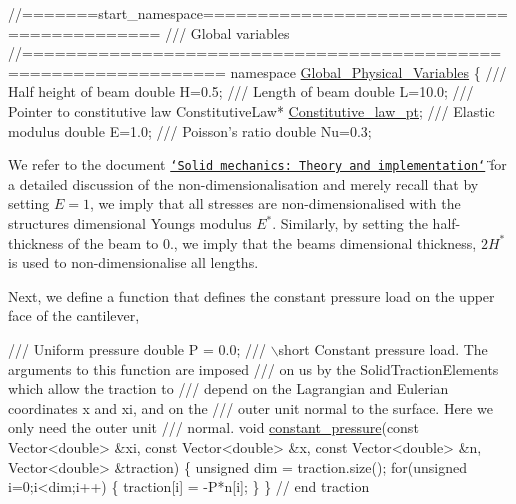  
\begin{DoxyCodeInclude}
\textcolor{comment}{//=======start\_namespace==========================================}
\textcolor{comment}{/// Global variables}
\textcolor{comment}{}\textcolor{comment}{//================================================================}
\textcolor{keyword}{namespace }\hyperlink{namespaceGlobal__Physical__Variables}{Global\_Physical\_Variables}
\{
\textcolor{comment}{}
\textcolor{comment}{ /// Half height of beam}
\textcolor{comment}{} \textcolor{keywordtype}{double} H=0.5;
\textcolor{comment}{}
\textcolor{comment}{ /// Length of beam}
\textcolor{comment}{} \textcolor{keywordtype}{double} L=10.0;
\textcolor{comment}{}
\textcolor{comment}{ /// Pointer to constitutive law}
\textcolor{comment}{} ConstitutiveLaw* \hyperlink{namespaceGlobal__Physical__Variables_a5d5f19442938130d36ee7476ae25049c}{Constitutive\_law\_pt};
\textcolor{comment}{}
\textcolor{comment}{ /// Elastic modulus}
\textcolor{comment}{} \textcolor{keywordtype}{double} E=1.0;
\textcolor{comment}{}
\textcolor{comment}{ /// Poisson's ratio}
\textcolor{comment}{} \textcolor{keywordtype}{double} Nu=0.3;

\end{DoxyCodeInclude}


We refer to the document \href{../../solid_theory/html/index.html}{\tt \char`\"{}\+Solid mechanics\+: Theory and implementation\char`\"{}} for a detailed discussion of the non-\/dimensionalisation and merely recall that by setting $ E = 1$, we imply that all stresses are non-\/dimensionalised with the structure\textquotesingle{}s dimensional Young\textquotesingle{}s modulus $ E^* $. Similarly, by setting the half-\/thickness of the beam to 0., we imply that the beam\textquotesingle{}s dimensional thickness, $ 2H^*$ is used to non-\/dimensionalise all lengths.

Next, we define a function that defines the constant pressure load on the upper face of the cantilever,


\begin{DoxyCodeInclude}
 \textcolor{comment}{/// Uniform pressure}
 \textcolor{keywordtype}{double} P = 0.0;
\textcolor{comment}{}
\textcolor{comment}{ /// \(\backslash\)short Constant pressure load. The arguments to this function are imposed}
\textcolor{comment}{ /// on us by the SolidTractionElements which allow the traction to }
\textcolor{comment}{ /// depend on the Lagrangian and Eulerian coordinates x and xi, and on the }
\textcolor{comment}{ /// outer unit normal to the surface. Here we only need the outer unit}
\textcolor{comment}{ /// normal.}
\textcolor{comment}{} \textcolor{keywordtype}{void} \hyperlink{namespaceGlobal__Physical__Variables_a19f4e20a92e7d216b4d2b00308f96917}{constant\_pressure}(\textcolor{keyword}{const} Vector<double> &xi, \textcolor{keyword}{const} Vector<double> &x,
                        \textcolor{keyword}{const} Vector<double> &n, Vector<double> &traction)
 \{
  \textcolor{keywordtype}{unsigned} dim = traction.size();
  \textcolor{keywordflow}{for}(\textcolor{keywordtype}{unsigned} i=0;i<dim;i++)
   \{
    traction[i] = -P*n[i];
   \}
 \} \textcolor{comment}{// end traction}

\end{DoxyCodeInclude}


